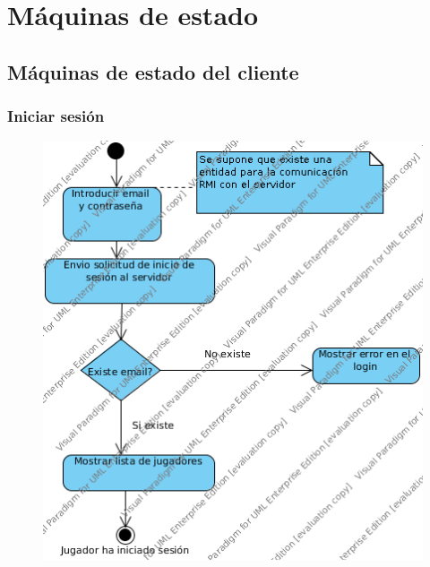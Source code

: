 \section{Máquinas de estado}
\subsection{Máquinas de estado del cliente}
\subsubsection{Iniciar sesión}
 \begin{figure}[h]
 \centering
 \includegraphics[scale=0.5]{img/ms_IniciarSesionCliente.png}
 \end{figure}
